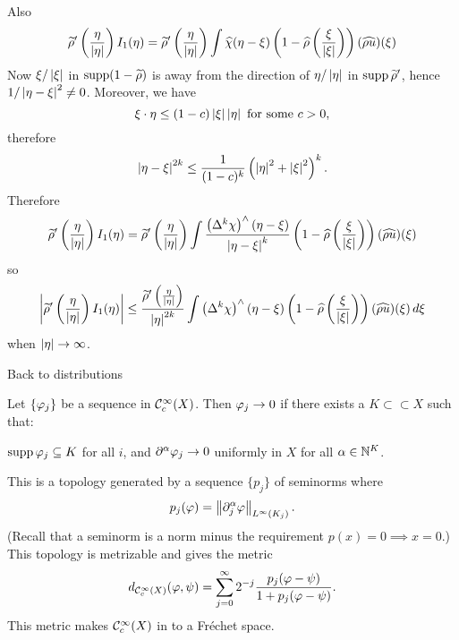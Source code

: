 Also
\begin{equation*}
  \widetilde\rho'\left( \frac\eta{\left\lvert \eta \right\rvert} \right)I_1(\eta) = \widetilde\rho'\left( \frac\eta{\left\lvert \eta \right\rvert} \right) \int \widehat\chi(\eta-\xi)\left( 1-\widehat\rho\left( \frac\xi{\left\lvert \xi \right\rvert} \right) \right) (\widehat{\rho u})(\xi)
\end{equation*}
Now $\xi/\left\lvert \xi \right\rvert$ in $\operatorname{supp}(1-\widetilde\rho)$ is away from the direction of $\eta/\left\lvert \eta \right\rvert$ in $\operatorname{supp}\widetilde\rho'$, hence $1/\left\lvert \eta-\xi \right\rvert^2\neq0$.
Moreover, we have
\[ \xi\cdot\eta \leq (1-c)\left\lvert \xi \right\rvert\left\lvert \eta \right\rvert \text{ for some } c>0, \]
therefore
\[ \left\lvert \eta-\xi \right\rvert^{2k} \leq \frac1{(1-c)^k}\left( \left\lvert \eta \right\rvert^2+\left\lvert \xi \right\rvert^2 \right)^k. \]
Therefore
\begin{equation*}
  \widetilde\rho'\left( \frac\eta{\left\lvert \eta \right\rvert} \right)I_1(\eta) = \widetilde\rho'\left( \frac\eta{\left\lvert \eta \right\rvert} \right) \int \frac{\left(\Delta^k\chi \right)^\wedge(\eta-\xi)}{\left\lvert \eta-\xi \right\rvert^k} \left( 1-\widehat\rho\left( \frac\xi{\left\lvert \xi \right\rvert} \right) \right) (\widehat{\rho u})(\xi)
\end{equation*}
so
\begin{equation*}
  \left\lvert \widetilde\rho'\left( \frac\eta{\left\lvert \eta \right\rvert} \right)I_1(\eta) \right\rvert \leq \frac{\widetilde\rho'\left( \frac{\eta}{\left\lvert \eta \right\rvert} \right)}{\left\lvert \eta \right\rvert^{2k}} \int \left(\Delta^k\chi \right)^\wedge(\eta-\xi) \left( 1-\widehat\rho\left( \frac\xi{\left\lvert \xi \right\rvert} \right) \right) (\widehat{\rho u})(\xi) \, d\xi
\end{equation*}
when $\left\lvert \eta \right\rvert\to\infty$.

Back to distributions

\begin{defn}
  Let $\{\varphi_j\}$ be a sequence in $\mathcal{C}_c^\infty(X)$.
  Then $\varphi_j \to 0$ if there exists a $K \subset\subset X$ such that:
  \begin{enum}
    \io $\operatorname{supp}\varphi_j\subseteq K$ for all $i$, and
    \io $\partial^\alpha\varphi_j \to 0$ uniformly in $X$ for all $\alpha\in\mathbb{N}^K$.
  \end{enum}
\end{defn}

\begin{rmk}
  This is a topology generated by a sequence $\{p_j\}$ of seminorms where
  \[ p_j(\varphi) = \left\lVert \partial^\alpha_j\varphi \right\rVert_{L^\infty(K_j)}. \]
  (Recall that a seminorm is a norm minus the requirement $p(x)=0\implies x=0$.)
  This topology is metrizable and gives the metric
  \[ d_{\mathcal{C}_c^\infty(X)}(\varphi,\psi) = \sum_{j=0}^\infty 2^{-j} \frac{p_j(\varphi-\psi)}{1+p_j(\varphi-\psi)}. \]
  This metric makes $\mathcal{C}_c^\infty(X)$ in to a Fr\'echet space.
\end{rmk}


